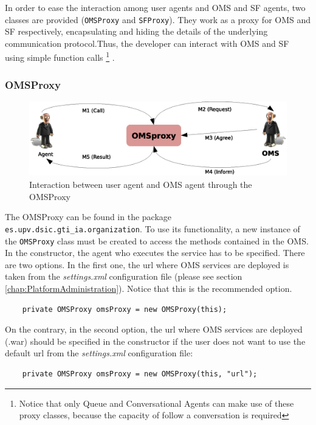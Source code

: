 In order to ease the interaction among user agents and OMS and SF agents, two classes are provided (\lstinline|OMSProxy| and \lstinline|SFProxy|). They work as a proxy for OMS and SF respectively, encapsulating and hiding the details of the underlying communication protocol.Thus, the developer can interact with OMS and SF using simple function calls \footnote{Notice that only Queue and Conversational Agents can make use of these proxy classes, because  the capacity of follow a conversation is required} .

\subsubsection{OMSProxy}

\begin{figure}[h!t]
	\centering
	\includegraphics[width=1.0\textwidth]{Thomas/images/oms_omsProxy_interaction}
	\caption{Interaction between user agent and OMS agent through the OMSProxy}
\end{figure}

The OMSProxy can be found in the package \lstinline|es.upv.dsic.gti_ia.organization|. To use its functionality, a new instance of the \lstinline|OMSProxy| class must be created to access the methods contained in the OMS. In the constructor, the agent who executes the service has to be specified. There are two options. In the first one, the url where OMS services are deployed is taken from the \textit{settings.xml} configuration file (please see section \ref{chap:PlatformAdministration}). Notice that this is the recommended option.

\begin{lstlisting}
	private OMSProxy omsProxy = new OMSProxy(this);
\end{lstlisting}

On the contrary, in the second option, the url where OMS services are deployed (.war) should be specified in the constructor if the user does not want to use the default url from the \textit{settings.xml} configuration file:

\begin{lstlisting}
	private OMSProxy omsProxy = new OMSProxy(this, "url");
\end{lstlisting}


